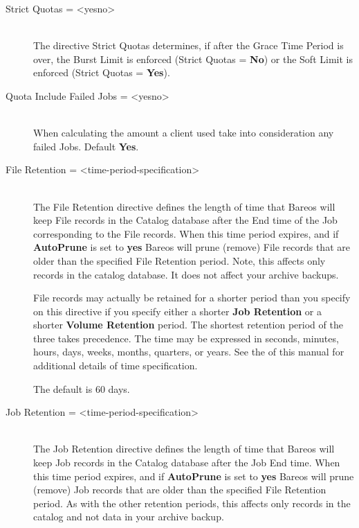 \begin{description}
\item [Strict Quotas = {\textless}yes{\textbar}no{\textgreater}] \hfill \\
The directive Strict Quotas determines, if after the Grace Time Period is over,
the Burst Limit is enforced (Strict Quotas = {\bf No}) or
the Soft Limit is enforced (Strict Quotas = {\bf Yes}).

\item [Quota Include Failed Jobs = {\textless}yes{\textbar}no{\textgreater}] \hfill \\
When calculating the amount a client used take into consideration any failed Jobs.
Default {\bf Yes}.

\item [File Retention = {\textless}time-period-specification{\textgreater}] \hfill \\
\label{FileRetention}
The File Retention directive defines the length of time that  Bareos will
keep File records in the Catalog database after the End time of the
Job corresponding to the File records.
When this time period expires, and if
{\bf AutoPrune} is set to  {\bf yes} Bareos will prune (remove) File records
that  are older than the specified File Retention period. Note, this  affects
only records in the catalog database. It does not  affect your archive
backups.

File records  may actually be retained for a shorter period than you specify
on  this directive if you specify either a shorter {\bf Job Retention}  or a
shorter {\bf Volume Retention} period. The shortest  retention period of the
three takes precedence.  The time may be expressed in seconds, minutes,
hours, days, weeks, months, quarters, or years. See the
 of this  manual for
additional details of time specification.

The  default is 60 days.

\item [Job Retention = {\textless}time-period-specification{\textgreater}] \hfill \\
\label{JobRetention}
The Job Retention directive defines the length of time that  Bareos will keep
Job records in the Catalog database after the Job End time.  When
this time period expires, and if {\bf AutoPrune} is set to {\bf yes}
Bareos will prune (remove) Job records that are older than the specified
File Retention period.  As with the other retention periods, this
affects only records in the catalog and not data in your archive backup.


\end{description}
